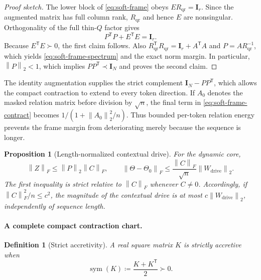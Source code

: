\documentclass[10pt]{article}
\newtheorem{proposition}[theorem]{Proposition}
\newtheorem{definition}[theorem]{Definition}
\newcommand{\I}{\mathbf{I}}
\newcommand{\T}{\mathsf{T}}
\newcommand{\norm}[1]{\left\lVert #1 \right\rVert}
\newcommand{\sym}{\operatorname{sym}}
\begin{document}
\begin{proof}[Proof sketch]
The lower block of \eqref{eq:soft-frame} obeys
$ER_{\mathrm{qr}}=\I_r$.  Since the augmented matrix has full
column rank, $R_{\mathrm{qr}}$ and hence $E$ are nonsingular.  Orthogonality
of the full thin-$Q$ factor gives
\begin{equation}
    P^\T P+E^\T E=\I_r.
\end{equation}
Because $E^\T E\succ0$, the first claim follows.  Also
$R_{\mathrm{qr}}^\T R_{\mathrm{qr}}=\I_r+A^\T A$ and
$P=AR_{\mathrm{qr}}^{-1}$, which yields
\eqref{eq:soft-frame-spectrum} and the exact norm margin.  In particular,
$\norm{P}_2<1$, which implies $PP^\T\prec\I_N$ and proves the second claim.
\end{proof}

The identity augmentation supplies the strict complement $\I_N-PP^\T$, which
allows the compact contraction to extend to every token direction.  If $A_0$ denotes
the masked relation matrix before division by $\sqrt n$, the final term in
\eqref{eq:soft-frame-contract} becomes
$1/(1+\norm{A_0}_2^2/n)$.  Thus bounded per-token relation energy prevents the
frame margin from deteriorating merely because the sequence is longer.

\begin{proposition}[Length-normalized contextual drive]
\label{prop:length-normalized-drive}
For the dynamic core,
\begin{equation}
    \norm{Z}_F\leq\norm{P}_2\norm{C}_F,
    \qquad
    \norm{\Theta-\Theta_0}_F
    \leq \frac{\norm{C}_F}{\sqrt n}\norm{W_{\mathrm{drive}}}_2.
\label{eq:length-normalized-drive}
\end{equation}
The first inequality is strict relative to $\norm{C}_F$ whenever $C\neq0$.
Accordingly, if $\norm{C}_F^2/n\leq c^2$, the magnitude of the contextual
drive is at most $c\norm{W_{\mathrm{drive}}}_2$, independently of sequence
length.
\end{proposition}

\paragraph{A complete compact contraction chart.}

\begin{definition}[Strict accretivity]
\label{def:accretive}
A real square matrix $K$ is strictly accretive when
\begin{equation}
    \sym(K) \coloneqq \frac{K+K^\T}{2}\succ0.
\end{equation}
\end{definition}
\end{document}
